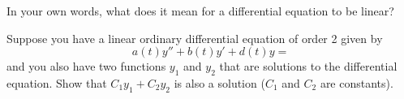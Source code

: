 \documentclass[12pt]{article}
\begin{document}
\begin{enumerate}
  \setcounter{problemnumber}{0}
  \Problem 
  In your own words, what does it mean for a differential equation to be linear?
  
  \vfill
  
  \Problem Suppose you have a linear ordinary differential equation of order 2 given by $$a(t)y''+b(t)y'+d(t)y=$$ and you also have two functions $y_1$ and $y_2$ that are solutions to the differential equation. Show that $C_1y_1+C_2y_2$ is also a solution ($C_1$ and $C_2$ are constants). 
  
  \vfill
  \vfill


\end{enumerate}
\end{document}
